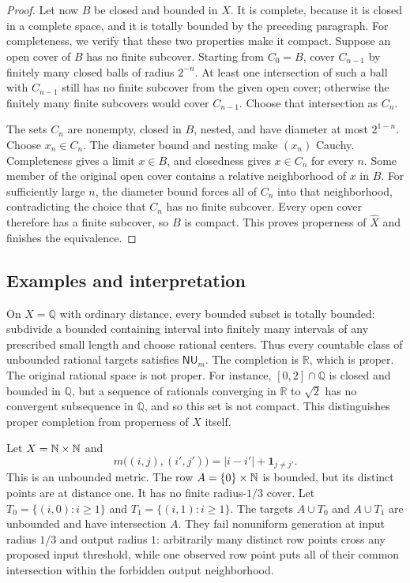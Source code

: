 \begin{proof}
Let now $B$ be closed and bounded in $\widehat X$. It is complete,
because it is closed in a complete space, and it is totally bounded by
the preceding paragraph. For completeness, we verify that these two
properties make it compact. Suppose an open cover of $B$ has no finite
subcover. Starting from $C_0=B$, cover $C_{n-1}$ by finitely many
closed balls of radius $2^{-n}$. At least one intersection of such a
ball with $C_{n-1}$ still has no finite subcover from the given open
cover; otherwise the finitely many finite subcovers would cover
$C_{n-1}$. Choose that intersection as $C_n$.

The sets $C_n$ are nonempty, closed in $B$, nested, and have diameter
at most $2^{1-n}$. Choose $x_n\in C_n$. The diameter bound and nesting
make $(x_n)$ Cauchy. Completeness gives a limit $x\in B$, and closedness
gives $x\in C_n$ for every $n$. Some member of the original open cover
contains a relative neighborhood of $x$ in $B$. For sufficiently large
$n$, the diameter bound forces all of $C_n$ into that neighborhood,
contradicting the choice that $C_n$ has no finite subcover. Every open
cover therefore has a finite subcover, so $B$ is compact. This proves
properness of $\widehat X$ and finishes the equivalence.
\end{proof}

\subsection{Examples and interpretation}

\begin{remark}
\label{mt:rationals}
On $X=\mathbb Q$ with ordinary distance, every bounded subset is totally
bounded: subdivide a bounded containing interval into finitely many
intervals of any prescribed small length and choose rational centers.
Thus every countable class of unbounded rational targets satisfies
$\mathsf{NU}_m$. The completion is $\mathbb R$, which is proper.
The original rational space is not proper. For instance,
$[0,2]\cap\mathbb Q$ is closed and bounded in $\mathbb Q$, but a sequence
of rationals converging in $\mathbb R$ to $\sqrt2$ has no convergent
subsequence in $\mathbb Q$, and so this set is not compact.
This distinguishes proper completion from properness of $X$ itself.
\end{remark}

\begin{remark}
\label{mt:badspace}
Let $X=\mathbb N\times\mathbb N$ and
\[
 m\bigl((i,j),(i',j')\bigr)=|i-i'|+\mathbf1_{j\ne j'}.
\]
This is an unbounded metric. The row $A=\{0\}\times\mathbb N$ is bounded,
but its distinct points are at distance one. It has no finite
radius-$1/3$ cover. Let
$T_0=\{(i,0):i\ge1\}$ and $T_1=\{(i,1):i\ge1\}$.
The targets $A\cup T_0$ and $A\cup T_1$ are unbounded and have
intersection $A$. They fail nonuniform generation at input radius
$1/3$ and output radius $1$: arbitrarily many distinct row points cross
any proposed input threshold, while one observed row point puts all of
their common intersection within the forbidden output neighborhood.
\end{remark}

